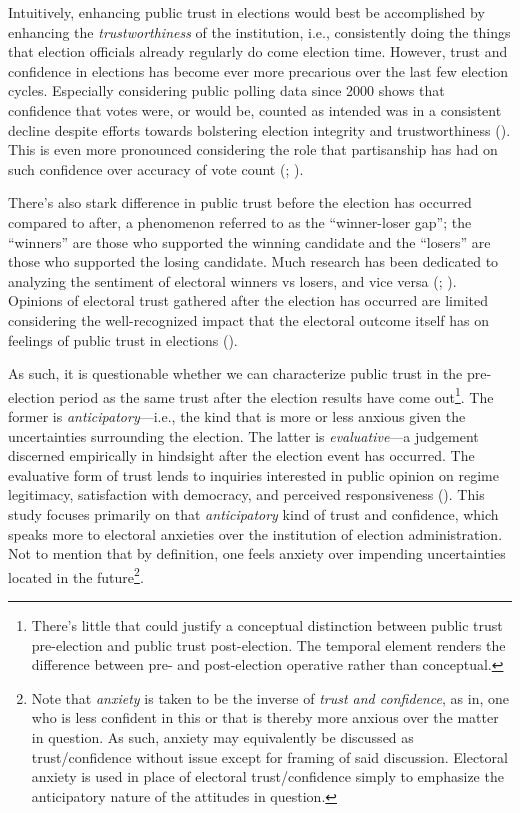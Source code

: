 \documentclass[
  11pt,
  a4paper,
]{scrartcl}
\begin{document}
Intuitively, enhancing public trust in elections would best be
accomplished by enhancing the \emph{trustworthiness} of the institution,
i.e., consistently doing the things that election officials already
regularly do come election time. However, trust and confidence in
elections has become ever more precarious over the last few election
cycles. Especially considering public polling data since 2000 shows that
confidence that votes were, or would be, counted as intended was in a
consistent decline despite efforts towards bolstering election integrity
and trustworthiness (). This is even more pronounced considering the role that
partisanship has had on such confidence over accuracy of vote count
(;
).

There's also stark difference in public trust before the election has
occurred compared to after, a phenomenon referred to as the
``winner-loser gap''; the ``winners'' are those who supported the
winning candidate and the ``losers'' are those who supported the losing
candidate. Much research has been dedicated to analyzing the sentiment
of electoral winners vs losers, and vice versa
(;
). Opinions of electoral
trust gathered after the election has occurred are limited considering
the well-recognized impact that the electoral outcome itself has on
feelings of public trust in elections
().

As such, it is questionable whether we can characterize public trust in
the pre-election period as the same trust after the election results
have come out\footnote{There's little that could justify a conceptual
  distinction between public trust pre-election and public trust
  post-election. The temporal element renders the difference between
  pre- and post-election operative rather than conceptual.}. The former
is \emph{anticipatory}---i.e., the kind that is more or less anxious
given the uncertainties surrounding the election. The latter is
\emph{evaluative}---a judgement discerned empirically in hindsight after
the election event has occurred. The evaluative form of trust lends to
inquiries interested in public opinion on regime legitimacy,
satisfaction with democracy, and perceived responsiveness
(). This study
focuses primarily on that \emph{anticipatory} kind of trust and
confidence, which speaks more to electoral anxieties over the
institution of election administration. Not to mention that by
definition, one feels anxiety over impending uncertainties located in
the future\footnote{Note that \emph{anxiety} is taken to be the inverse
  of \emph{trust and confidence}, as in, one who is less confident in
  this or that is thereby more anxious over the matter in question. As
  such, anxiety may equivalently be discussed as trust/confidence
  without issue except for framing of said discussion. Electoral anxiety
  is used in place of electoral trust/confidence simply to emphasize the
  anticipatory nature of the attitudes in question.}.
\end{document}
